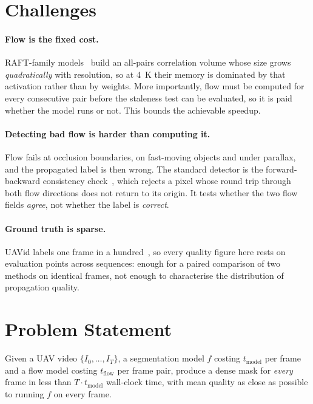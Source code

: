 \documentclass[report.tex]{subfiles}
\begin{document}
\section{Challenges}
\label{sec:challenges}

\paragraph{Flow is the fixed cost.} RAFT-family
models~\cite{raft2020,searaft2024} build an all-pairs correlation volume whose
size grows \emph{quadratically} with resolution, so at \SI{4}{K} their memory
is dominated by that activation rather than by weights. More importantly, flow
must be computed for every consecutive pair before the staleness test can be
evaluated, so it is paid whether the model runs or not. This bounds the
achievable speedup.

\paragraph{Detecting bad flow is harder than computing it.} Flow fails at
occlusion boundaries, on fast-moving objects and under parallax, and the
propagated label is then wrong. The standard detector is the forward-backward
consistency check~\cite{sundaram2010}, which rejects a pixel whose round trip
through both flow directions does not return to its origin. It tests whether
the two flow fields \emph{agree}, not whether the label is \emph{correct}.

\paragraph{Ground truth is sparse.} UAVid labels one frame in a
hundred~\cite{uavid2020}, so every quality figure here rests on \NumGT{}
evaluation points across \NumSeq{} sequences: enough for a paired comparison of
two methods on identical frames, not enough to characterise the distribution of
propagation quality.

\section{Problem Statement}
\label{sec:problem}

Given a UAV video $\{I_0, \dots, I_{T}\}$, a segmentation model $f$ costing
$t_{\text{model}}$ per frame and a flow model costing $t_{\text{flow}}$ per
frame pair, produce a dense mask for \emph{every} frame in less than
$T \cdot t_{\text{model}}$ wall-clock time, with mean quality as close as
possible to running $f$ on every frame.
\end{document}
